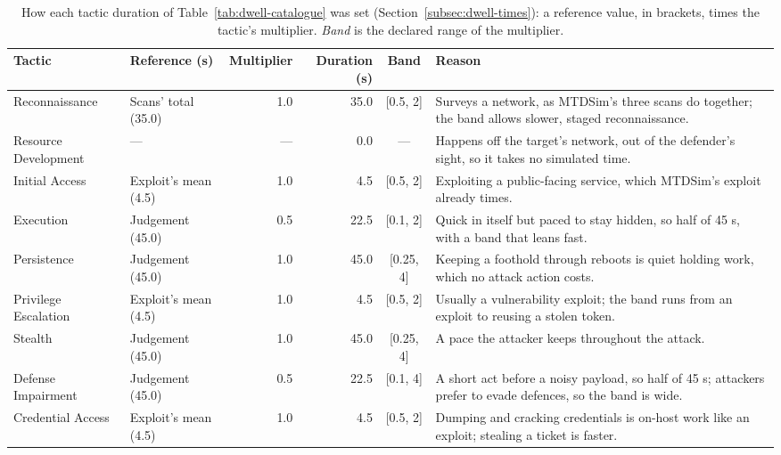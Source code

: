 
\begin{table}[htbp]
\centering
\caption[How each tactic duration was set]{How each tactic duration of Table~\ref{tab:dwell-catalogue} was set (Section~\ref{subsec:dwell-times}): a reference value, in brackets, times the tactic's multiplier. \emph{Band} is the declared range of the multiplier.}
\label{tab:dwell-derivation}
\tablestyle
\begin{tabular}{@{}P{0.15\textwidth} P{0.13\textwidth} r r c P{0.29\textwidth}@{}}
\toprule
Tactic & Reference (s) & Multiplier & Duration (s) & Band & Reason \\
\midrule
Reconnaissance & Scans' total (35.0) & 1.0 & 35.0 & [0.5, 2] & Surveys a network, as MTDSim's three scans do together; the band allows slower, staged reconnaissance. \\
Resource Development & --- & --- & 0.0 & --- & Happens off the target's network, out of the defender's sight, so it takes no simulated time. \\
Initial Access & Exploit's mean (4.5) & 1.0 & 4.5 & [0.5, 2] & Exploiting a public-facing service, which MTDSim's exploit already times. \\
Execution & Judgement (45.0) & 0.5 & 22.5 & [0.1, 2] & Quick in itself but paced to stay hidden, so half of 45 s, with a band that leans fast. \\
Persistence & Judgement (45.0) & 1.0 & 45.0 & [0.25, 4] & Keeping a foothold through reboots is quiet holding work, which no attack action costs. \\
Privilege Escalation & Exploit's mean (4.5) & 1.0 & 4.5 & [0.5, 2] & Usually a vulnerability exploit; the band runs from an exploit to reusing a stolen token. \\
Stealth & Judgement (45.0) & 1.0 & 45.0 & [0.25, 4] & A pace the attacker keeps throughout the attack. \\
Defense Impairment & Judgement (45.0) & 0.5 & 22.5 & [0.1, 4] & A short act before a noisy payload, so half of 45 s; attackers prefer to evade defences, so the band is wide. \\
Credential Access & Exploit's mean (4.5) & 1.0 & 4.5 & [0.5, 2] & Dumping and cracking credentials is on-host work like an exploit; stealing a ticket is faster. \\

\end{tabular}
\end{table}
